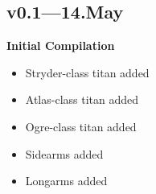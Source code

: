 \documentclass[9pt, openany]{extbook}
\begin{document}
{\subsection{v0.1---14.May}
\textbf{Initial Compilation}

\begin{itemize}[noitemsep]
\item Stryder-class titan added
\item Atlas-class titan added
\item Ogre-class titan added
\item Sidearms added
\item Longarms added
\end{itemize}


}
\end{document}

